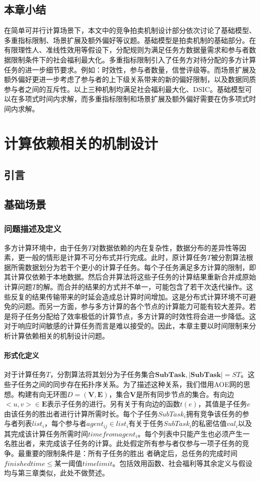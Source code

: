 \documentclass[promaster]{thesis-uestc}
\begin{document}
\section{本章小结}
在简单可并行计算场景下，本文中的竞争拍卖机制设计部分依次讨论了基础模型、多重指标限制、场景扩展及额外偏好等议题。基础模型是拍卖机制的基础部分。在有限理性人、准线性效用等假设下，分配规则为满足任务方数据量需求和参与者数据限制条件下的社会福利最大化。多重指标限制引入了任务方对待分配的多方计算任务的进一步细节要求。例如：时效性，参与者数量，信誉评级等。而场景扩展及额外偏好更进一步考虑了参与者的上下级关系带来的新的偏好限制，以及数据同质参与者之间的互斥性。以上三种机制均满足社会福利最大化、DSIC。基础模型可以在多项式时间内求解，而多重指标限制和场景扩展及额外偏好需要在伪多项式时间内求解。

\chapter{计算依赖相关的机制设计}
\section{引言}
\section{基础场景}
\subsection{问题描述及定义}
多方计算环境中，由于任务$T$对数据依赖的内在复杂性，数据分布的差异性等因素，更一般的情形是计算不可分布式并行完成。此时，原计算任务$T$被分割算法根据所需数据划分为若干个更小的计算子任务。每个子任务满足多方计算的限制，即其计算仅依赖于本地数据。然后合并算法将这些子任务的计算结果重新合并成原始计算问题$T$的解。而合并的结果的方式并不单一，可能包含了若干次迭代操作。这些反复的结果传输带来的时延会造成总计算时间增加。这是分布式计算环境不可避免的问题。而另一方面，参与多方计算的各个节点的计算能力可能有较大差异。若是将子任务分配给了效率极低的计算节点，多方计算的时效性将会进一步降低。这对于响应时间敏感的计算任务而言是难以接受的。因此，本章主要以时间限制来分析计算依赖相关的机制设计问题。

\subsubsection{形式化定义}
对于计算任务$T$，分割算法将其划分为子任务集合$\mathbf{SubTask},|\mathbf{SubTask}| = ST$。这些子任务之间的同步存在拓扑序关系。为了描述这种关系，我们借用AOE网的思想。构建有向无环图$D=(\mathbf{V},\mathbf{E})$，集合$\mathbf{V}$是所有同步节点的集合。有向边$<u,v> \in \mathbf{E}$表示子任务的进行。另有关于有向边的函数$t(e)$，其值是子任务$e$由该任务的胜出者进行计算所需时长。每个子任务$SubTask_i$拥有竞争该任务的参与者列表$list_i$，每个参与者$agent_{ij} \in list_i$有关于任务$SubTask_i$的私密估值$val_i$以及其完成该计算任务所需时间$timefromagent_i$。每个列表中只能产生也必须产生一名胜出者，来完成该子任务的计算。此处假定所有参与者仅参与一项子任务的竞争。最重要的限制条件是：所有子任务的胜出
者确定后，总任务的完成时间$finishedtime \leq $某一阈值$timelimit$。包括效用函数、社会福利等其余定义与假设均与第三章类似，此处不做赘述。
\end{document}
